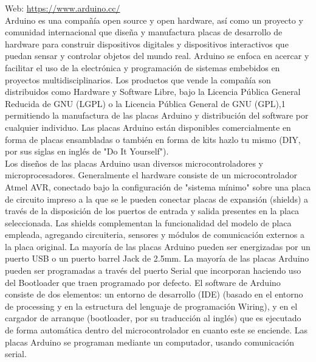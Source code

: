 Web: \url{https://www.arduino.cc/}\\

Arduino es una compañía open source y open hardware, así como un proyecto y comunidad internacional que diseña y manufactura placas de desarrollo de hardware para construir
dispositivos digitales y dispositivos interactivos que puedan sensar y controlar objetos del mundo real. Arduino se enfoca en acercar y facilitar el uso de la electrónica y 
programación de sistemas embebidos en proyectos multidisciplinarios. Los productos que vende la compañía son distribuidos como Hardware y Software Libre, bajo la Licencia Pública 
General Reducida de GNU (LGPL) o la Licencia Pública General de GNU (GPL),1​permitiendo la manufactura de las placas Arduino y distribución del software por cualquier individuo.
Las placas Arduino están disponibles comercialmente en forma de placas ensambladas o también en forma de kits hazlo tu mismo (DIY, por sus siglas en inglés de "Do It Yourself").\\

Los diseños de las placas Arduino usan diversos microcontroladores y microprocesadores. Generalmente el hardware consiste de un microcontrolador Atmel AVR, conectado bajo la 
configuración de "sistema mínimo" sobre una placa de circuito impreso a la que se le pueden conectar placas de expansión (shields) a través de la disposición de los puertos de 
entrada y salida presentes en la placa seleccionada. Las shields complementan la funcionalidad del modelo de placa empleada, agregando circuiteria, sensores y módulos de 
comunicación externos a la placa original. La mayoría de las placas Arduino pueden ser energizadas por un puerto USB o un puerto barrel Jack de 2.5mm. La mayoría de las placas 
Arduino pueden ser programadas a través del puerto Serial que incorporan haciendo uso del Bootloader que traen programado por defecto. El software de Arduino consiste de dos 
elementos: un entorno de desarrollo (IDE) (basado en el entorno de processing y en la estructura del lenguaje de programación Wiring), y en el cargador de arranque (bootloader,
por su traducción al inglés) que es ejecutado de forma automática dentro del microcontrolador en cuanto este se enciende. Las placas Arduino se programan mediante un computador, 
usando comunicación serial.\\


